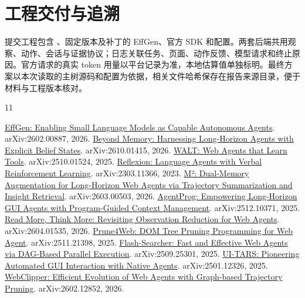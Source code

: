 \documentclass[UTF8,zihao=5,fontset=windows,a4paper]{ctexart}
\begin{document}
\section{工程交付与追溯}

提交工程包含 、固定版本及补丁的 EffGen、官方 SDK 和配置。两套后端共用观察、动作、会话与证据协议；日志关联任务、页面、动作反馈、模型请求和终止原因。官方请求的真实 token 用量以平台记录为准，本地估算值单独标明。最终方案以本次读取的主树源码和配置为依据，相关文件哈希保存在报告来源目录，便于材料与工程版本核对。

\begingroup
\renewcommand{\refname}{参考文献}
\linespread{1.0}
\fontsize{9.3}{13.2}\selectfont
\setlength{\parskip}{0pt}
\begin{thebibliography}{11}
\raggedright
\setlength{\itemsep}{3pt}
\setlength{\parsep}{0pt}
 \href{https://arxiv.org/abs/2602.00887}{EffGen: Enabling Small Language Models as Capable Autonomous Agents}. arXiv:2602.00887, 2026.
 \href{https://arxiv.org/abs/2610.01415}{Beyond Memory: Harnessing Long-Horizon Agents with Explicit Belief States}. arXiv:2610.01415, 2026.
 \href{https://arxiv.org/abs/2510.01524}{WALT: Web Agents that Learn Tools}. arXiv:2510.01524, 2025.
 \href{https://arxiv.org/abs/2303.11366}{Reflexion: Language Agents with Verbal Reinforcement Learning}. arXiv:2303.11366, 2023.
 \href{https://arxiv.org/abs/2603.00503}{M²: Dual-Memory Augmentation for Long-Horizon Web Agents via Trajectory Summarization and Insight Retrieval}. arXiv:2603.00503, 2026.
 \href{https://arxiv.org/abs/2512.10371}{AgentProg: Empowering Long-Horizon GUI Agents with Program-Guided Context Management}. arXiv:2512.10371, 2025.
 \href{https://arxiv.org/abs/2604.01535}{Read More, Think More: Revisiting Observation Reduction for Web Agents}. arXiv:2604.01535, 2026.
 \href{https://arxiv.org/abs/2511.21398}{Prune4Web: DOM Tree Pruning Programming for Web Agent}. arXiv:2511.21398, 2025.
 \href{https://arxiv.org/abs/2509.25301}{Flash-Searcher: Fast and Effective Web Agents via DAG-Based Parallel Execution}. arXiv:2509.25301, 2025.
 \href{https://arxiv.org/abs/2501.12326}{UI-TARS: Pioneering Automated GUI Interaction with Native Agents}. arXiv:2501.12326, 2025.
 \href{https://arxiv.org/abs/2602.12852}{WebClipper: Efficient Evolution of Web Agents with Graph-based Trajectory Pruning}. arXiv:2602.12852, 2026.
\end{thebibliography}
\endgroup
\end{document}
